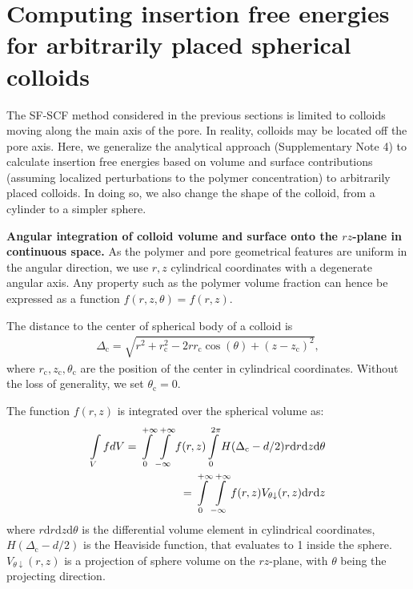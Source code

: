 \documentclass[10pt, a4paper, twocolumn]{article}
\begin{document}
\pagebreak
\section{Computing insertion free energies for arbitrarily placed spherical colloids}

The SF-SCF method considered in the previous sections is limited to colloids moving along the main axis of the pore.
In reality, colloids may be located off the pore axis.
Here, we generalize the analytical approach (Supplementary Note 4) to calculate insertion free energies based on volume and surface contributions (assuming localized perturbations to the polymer concentration) to arbitrarily placed colloids.
In doing so, we also change the shape of the colloid, from a cylinder to a simpler sphere.

\bigskip\noindent
\textbf{Angular integration of colloid volume and surface onto the $rz$-plane in continuous space.}
As the polymer and pore geometrical features are uniform in the angular direction, we use $r, z$ cylindrical coordinates with a degenerate angular axis.
Any property such as the polymer volume fraction can hence be expressed as a function $f(r,z,\theta) = f(r,z)$.

The distance to the center of spherical body of a colloid is 
\begin{eqnarray}
\Delta_{\text{c}} = \sqrt{r^2 + r_{\text{c}}^2 - 2 r r_{\text{c}} \cos(\theta) + (z - z_{\text{c}})^2},
\end{eqnarray} 
where $r_{\text{c}}, z_{\text{c}}, \theta_{\text{c}}$ are the position of the center in cylindrical coordinates.
Without the loss of generality, we set $\theta_{\text{c}} = 0$.

The function $f(r,z)$ is integrated over the spherical volume as:
\begin{eqnarray}
    \label{eq:int_indicator_V}
    \begin{aligned}
        \int\limits_{V} f dV
        =\int\displaylimits_{0}^{+\infty} \int\displaylimits_{-\infty}^{+\infty} f(r, z) \int\displaylimits_{0}^{2\pi}  H(\Delta_{\text{c}} - d/2) r \text{d}r \text{d}z \text{d}\theta \\
        =\int\displaylimits_{0}^{+\infty} \int\displaylimits_{-\infty}^{+\infty} f(r, z)  V_{\theta \downarrow}(r,z) \text{d}r \text{d}z
    \end{aligned}
\end{eqnarray}
where $r \text{d}r \text{d}z \text{d}\theta$ is the differential volume element in cylindrical coordinates, $H(\Delta_{\text{c}} - d/2)$ is the Heaviside function, that evaluates to 1 inside the sphere.
$V_{\theta \downarrow}(r,z)$ is a projection of sphere volume on the $rz$-plane, with $\theta$ being the projecting direction.
\end{document}
